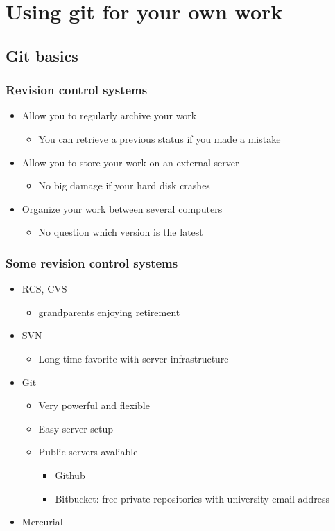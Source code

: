 \section[Git]{Using git for your own work}

\subsection{Git basics}
\begin{frame}
  \frametitle{Revision control systems}
  \begin{itemize}
  \item Allow you to regularly archive your work
    \begin{itemize}
    \item You can retrieve a previous status if you made a mistake
    \end{itemize}
  \item Allow you to store your work on an external server
    \begin{itemize}
    \item No big damage if your hard disk crashes
    \end{itemize}
  \item Organize your work between several computers
    \begin{itemize}
    \item No question which version is the latest
    \end{itemize}
  \end{itemize}
\end{frame}

\begin{frame}
  \frametitle{Some revision control systems}
  \begin{itemize}
  \item RCS, CVS
    \begin{itemize}
    \item grandparents enjoying retirement
    \end{itemize}
  \item SVN
    \begin{itemize}
    \item Long time favorite with server infrastructure
    \end{itemize}
  \item Git
    \begin{itemize}
    \item Very powerful and flexible
    \item Easy server setup
    \item Public servers avaliable
      \begin{itemize}
      \item Github
      \item Bitbucket: free private repositories with university email address
      \end{itemize}
    \end{itemize}
  \item Mercurial
  \end{itemize}
\end{frame}


